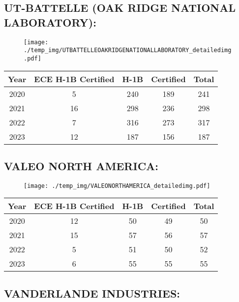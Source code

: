 \documentclass{article}%
\begin{document}
%
\newpage%
\subsection{UT{-}BATTELLE  (OAK RIDGE NATIONAL LABORATORY):}%
\label{subsec:UT{-}BATTELLE(OAKRIDGENATIONALLABORATORY)}%
\label{UTBATTELLEOAKRIDGENATIONALLABORATORYdetailed}%


\begin{figure}[htbp]%
\centering%
\texttt{[image: ./temp\_img/UTBATTELLEOAKRIDGENATIONALLABORATORY\_detailedimg.pdf]}%
\end{figure}

%
\begin{longtable}{c|c|c|c|c}%
\hline%
Year&ECE H{-}1B Certified&H{-}1B&Certified&Total\\%
\hline%
2020&5&240&189&241\\%
\hline%
2021&16&298&236&298\\%
\hline%
2022&7&316&273&317\\%
\hline%
2023&12&187&156&187\\%
\hline%
\end{longtable}

%
\newpage%
\subsection{VALEO NORTH AMERICA:}%
\label{subsec:VALEONORTHAMERICA}%
\label{VALEONORTHAMERICAdetailed}%


\begin{figure}[htbp]%
\centering%
\texttt{[image: ./temp\_img/VALEONORTHAMERICA\_detailedimg.pdf]}%
\end{figure}

%
\begin{longtable}{c|c|c|c|c}%
\hline%
Year&ECE H{-}1B Certified&H{-}1B&Certified&Total\\%
\hline%
2020&12&50&49&50\\%
\hline%
2021&15&57&56&57\\%
\hline%
2022&5&51&50&52\\%
\hline%
2023&6&55&55&55\\%
\hline%
\end{longtable}

%
\newpage%
\subsection{VANDERLANDE INDUSTRIES:}%
\label{subsec:VANDERLANDEINDUSTRIES}%
\label{VANDERLANDEINDUSTRIESdetailed}%
\end{document}
